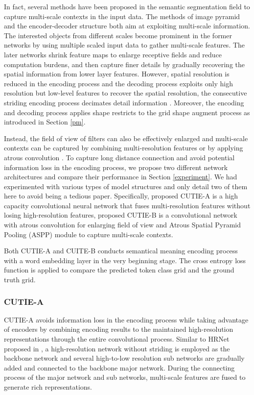 \documentclass[10pt,twocolumn,letterpaper]{article}
\begin{document}
In fact, several methods have been proposed in the semantic segmentation field to capture multi-scale contexts in the input data. The methods of image pyramid and the encoder-decoder structure both aim at exploiting multi-scale information. The interested objects from different scales become prominent in the former networks by using multiple scaled input data to gather multi-scale features. The later networks shrink feature maps to enlarge receptive fields and reduce computation burdens, and then capture finer details by gradually recovering the spatial information from lower layer features. However, spatial resolution is reduced in the encoding process and the decoding process exploits only high resolution but low-level features to recover the spatial resolution, the consecutive striding encoding process decimates detail information \cite{hrnet}. Moreover, the encoding and decoding process applies shape restricts to the grid shape augment process as introduced in Section \ref{pm}. 

Instead, the field of view of filters can also be effectively enlarged and multi-scale contexts can be captured by combining multi-resolution features \cite{hrnet} or by applying atrous convolution \cite{deeplab, deeplabv1, deeplabv3, deeplabv3p}. To capture long distance connection and avoid potential information loss in the encoding process, we propose two different network architectures and compare their performance in Section \ref{experiment}. We had experimented with various types of model structures and only detail two of them here to avoid being a tedious paper. Specifically, proposed CUTIE-A is a high capacity convolutional neural network that fuses multi-resolution features without losing high-resolution features, proposed CUTIE-B is a convolutional network with atrous convolution for enlarging field of view and Atrous Spatial Pyramid Pooling (ASPP) module to capture multi-scale contexts. 

Both CUTIE-A and CUITE-B conducts semantical meaning encoding process with a word embedding layer in the very beginning stage. The cross entropy loss function is applied to compare the predicted token class grid and the ground truth grid.

\subsubsection{CUTIE-A}
CUTIE-A avoids information loss in the encoding process while taking advantage of encoders by combining encoding results to the maintained high-resolution representations through the entire convolutional process. Similar to HRNet proposed in \cite{hrnet}, a high-resolution network without striding is employed as the backbone network and several high-to-low resolution sub networks are gradually added and connected to the backbone major network. During the connecting process of the major network and sub networks, multi-scale features are fused to generate rich representations.
\end{document}
